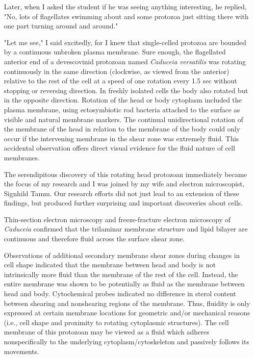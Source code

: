 \documentclass[authordate, anecdote]{jote-new-article}
\begin{document}
	Later, when I asked the student if he was seeing anything interesting, he replied, "No, lots of flagellates swimming about and some protozoa just sitting there with one part turning around and around."







	"Let me see," I said excitedly, for I knew that single-celled protozoa are bounded by a continuous unbroken plasma membrane. Sure enough, the flagellated anterior end of a devescovinid protozoan named \emph{Caduceia}\emph{ }\emph{versatilis} was rotating continuously in the same direction (clockwise, as viewed from the anterior) relative to the rest of the cell at a speed of one rotation every 1.5 sec without stopping or reversing direction. In freshly isolated cells the body also rotated but in the opposite direction. Rotation of the head or body cytoplasm included the plasma membrane, using ectosymbiotic rod bacteria attached to the surface as visible and natural membrane markers. The continual unidirectional rotation of the membrane of the head in relation to the membrane of the body could only occur if the intervening membrane in the shear zone was extremely fluid. This accidental observation offers direct visual evidence for the fluid nature of cell membranes.







	The serendipitous discovery of this rotating head protozoan immediately became the focus of my research and I was joined by my wife and electron microscopist, Signhild Tamm. Our research efforts did not just lead to an extension of these findings, but produced further surprising and important discoveries about cells.







	Thin-section electron microscopy and freeze-fracture electron microscopy of \emph{Caduceia}\emph{ }confirmed that the trilaminar membrane structure and lipid bilayer are continuous and therefore fluid across the surface shear zone.







	Observations of additional secondary membrane shear zones during changes in cell shape indicated that the membrane between head and body is not intrinsically more fluid than the membrane of the rest of the cell. Instead, the entire membrane was shown to be potentially as fluid as the membrane between head and body. Cytochemical probes indicated no difference in sterol content between shearing and nonshearing regions of the membrane. Thus, fluidity is only expressed at certain membrane locations for geometric and/or mechanical reasons (i.e., cell shape and proximity to rotating cytoplasmic structures). The cell membrane of this protozoan may be viewed as a fluid which adheres nonspecifically to the underlying cytoplasm/cytoskeleton and passively follows its movements.
\end{document}
